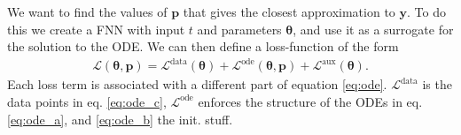 We want to find the values of $\mathbf{p}$ that gives the closest approximation to $\mathbf{y}$. To do this we create a FNN with  input $t$ and parameters $\mathbf{\theta}$, and use it as a surrogate for the solution to the ODE. We can then define a loss-function of the form
\begin{align*}
	\mathcal{L}(\boldsymbol{\theta}, \mathbf{p}) 
	= \mathcal{L}^{\text {data}}(\boldsymbol{\theta}) + \mathcal{L}^{\text {ode}}(\boldsymbol{\theta}, \mathbf{p}) + \mathcal{L}^{\text {aux}}(\boldsymbol{\theta}).
\end{align*}
Each loss term is associated with a different part of equation \ref{eq:ode}. %
$\mathcal{L}^{\text {data}}$ is the data points in eq. \ref{eq:ode_c}, $\mathcal{L}^{\text {ode}}$ enforces the structure of the ODEs in eq. \ref{eq:ode_a}, 
and \ref{eq:ode_b} the init. stuff. %




%
%
%
%








